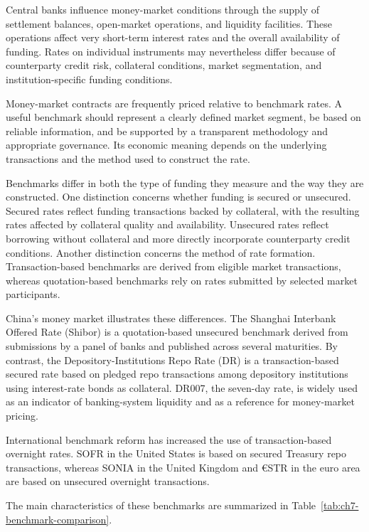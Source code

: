 Central banks influence money-market conditions through
the supply of settlement balances, open-market operations,
and liquidity facilities. These operations affect
very short-term interest rates and the overall availability
of funding. Rates on individual instruments may nevertheless
differ because of counterparty credit risk, collateral
conditions, market segmentation, and institution-specific
funding conditions.

Money-market contracts are frequently priced relative
to benchmark rates. A useful benchmark should represent
a clearly defined market segment, be based on reliable
information, and be supported by a transparent methodology
and appropriate governance. Its economic meaning depends
on the underlying transactions and the method used to
construct the rate.

Benchmarks differ in both the type of funding they measure
and the way they are constructed. One distinction concerns
whether funding is secured or unsecured. Secured rates
reflect funding transactions backed by collateral, with
the resulting rates affected by collateral quality and
availability. Unsecured rates reflect borrowing without
collateral and more directly incorporate counterparty
credit conditions. Another distinction concerns the
method of rate formation. Transaction-based benchmarks
are derived from eligible market transactions, whereas
quotation-based benchmarks rely on rates submitted by
selected market participants.

China's money market illustrates these differences.
The Shanghai Interbank Offered Rate (Shibor) is a
quotation-based unsecured benchmark derived from
submissions by a panel of banks and published across
several maturities. By contrast, the Depository-Institutions
Repo Rate (DR) is a transaction-based secured rate based
on pledged repo transactions among depository institutions
using interest-rate bonds as collateral. DR007, the
seven-day rate, is widely used as an indicator of
banking-system liquidity and as a reference for
money-market pricing.

International benchmark reform has increased the use
of transaction-based overnight rates. SOFR in the
United States is based on secured Treasury repo
transactions, whereas SONIA in the United Kingdom
and €STR in the euro area are based on unsecured
overnight transactions.

The main characteristics of these benchmarks are
summarized in Table~\ref{tab:ch7-benchmark-comparison}.

